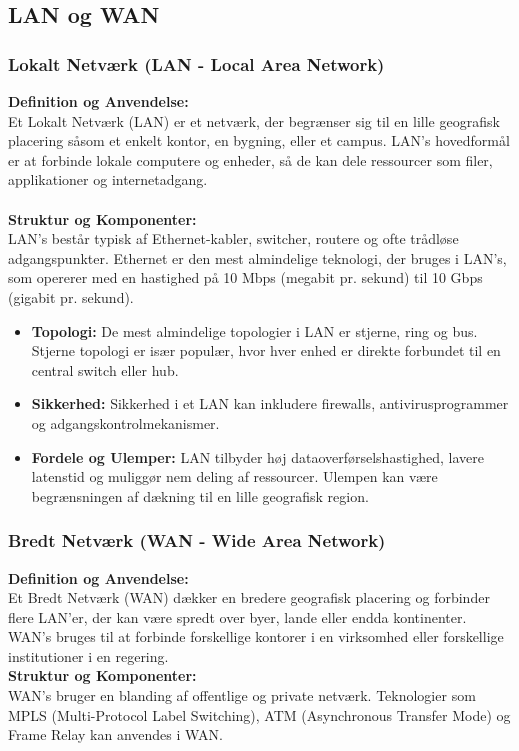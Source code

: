 \subsection{LAN og WAN}
\subsubsection{Lokalt Netværk (LAN - Local Area Network)}
\textbf{Definition og Anvendelse:}\\
Et Lokalt Netværk (LAN) er et netværk, der begrænser sig til en lille geografisk placering såsom et enkelt kontor, en bygning, eller et campus. LAN's hovedformål er at forbinde lokale computere og enheder, så de kan dele ressourcer som filer, applikationer og internetadgang.\\
\\
\textbf{Struktur og Komponenter:}\\
LAN's består typisk af Ethernet-kabler, switcher, routere og ofte trådløse adgangspunkter. Ethernet er den mest almindelige teknologi, der bruges i LAN's, som opererer med en hastighed på 10 Mbps (megabit pr. sekund) til 10 Gbps (gigabit pr. sekund).
\begin{itemize}
	\item \textbf{Topologi:} De mest almindelige topologier i LAN er stjerne, ring og bus. Stjerne topologi er især populær, hvor hver enhed er direkte forbundet til en central switch eller hub.
	\item \textbf{Sikkerhed:} Sikkerhed i et LAN kan inkludere firewalls, antivirusprogrammer og adgangskontrolmekanismer.
	\item \textbf{Fordele og Ulemper:} LAN tilbyder høj dataoverførselshastighed, lavere latenstid og muliggør nem deling af ressourcer. Ulempen kan være begrænsningen af dækning til en lille geografisk region.
\end{itemize}
\subsubsection{Bredt Netværk (WAN - Wide Area Network)}
\textbf{Definition og Anvendelse:}\\
Et Bredt Netværk (WAN) dækker en bredere geografisk placering og forbinder flere LAN'er, der kan være spredt over byer, lande eller endda kontinenter. WAN's bruges til at forbinde forskellige kontorer i en virksomhed eller forskellige institutioner i en regering.\\

\noindent\textbf{Struktur og Komponenter:}\\
WAN's bruger en blanding af offentlige og private netværk. Teknologier som MPLS (Multi-Protocol Label Switching), ATM (Asynchronous Transfer Mode) og Frame Relay kan anvendes i WAN.\\


